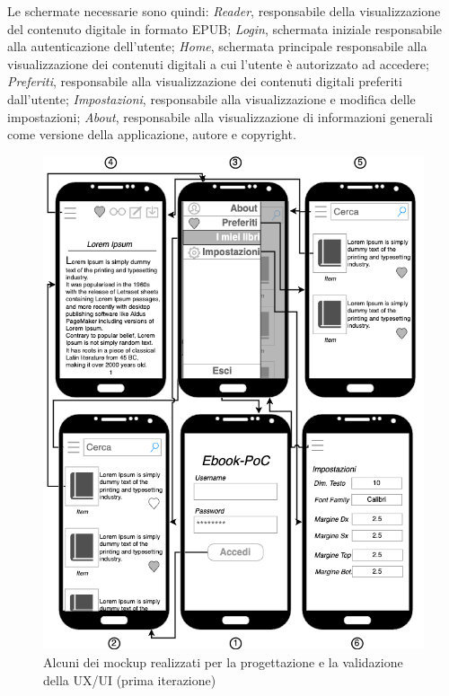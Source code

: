 Le schermate necessarie sono quindi: \textit{Reader}, responsabile della visualizzazione del contenuto digitale in formato EPUB; \textit{Login}, schermata iniziale responsabile alla autenticazione dell'utente; \textit{Home}, schermata principale responsabile alla visualizzazione dei contenuti digitali a cui l'utente è autorizzato ad accedere; \textit{Preferiti}, responsabile alla visualizzazione dei contenuti digitali preferiti dall'utente; \textit{Impostazioni}, responsabile alla visualizzazione e modifica delle impostazioni; \textit{About}, responsabile alla visualizzazione di informazioni generali come versione della applicazione, autore e copyright.

\begin{figure}[H]
    \centering
    \includegraphics[width=1\textwidth]{img/mockup-uiux-1.png}
    \caption{Alcuni dei mockup realizzati per la progettazione e la validazione della UX/UI (prima iterazione)}
\end{figure}

